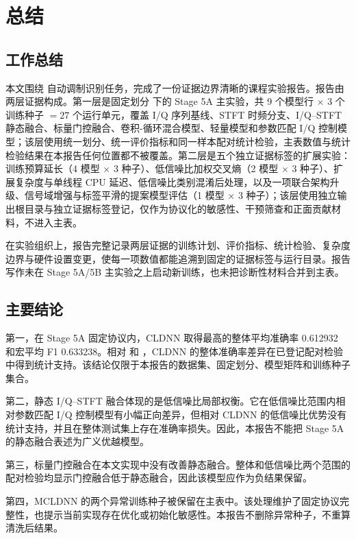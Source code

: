 \chapter{总结}

\section{工作总结}

本文围绕 \datasetname{} 自动调制识别任务，完成了一份证据边界清晰的课程实验报告。报告由两层证据构成。第一层是固定划分 \splitname{} 下的 Stage 5A 主实验，共 9 个模型行 \(\times\) 3 个训练种子 \(=27\) 个运行单元，覆盖 I/Q 序列基线、STFT 时频分支、I/Q--STFT 静态融合、标量门控融合、卷积-循环混合模型、轻量模型和参数匹配 I/Q 控制模型；该层使用统一划分、统一评价指标和同一样本配对统计检验，主表数值与统计检验结果在本报告任何位置都不被覆盖。第二层是五个独立证据标签的扩展实验：训练预算延长（4 模型 \(\times\) 3 种子）、低信噪比加权交叉熵（2 模型 \(\times\) 3 种子）、扩展复杂度与单线程 CPU 延迟、低信噪比类别混淆后处理，以及一项联合架构升级、信号域增强与标签平滑的提案模型评估（1 模型 \(\times\) 3 种子）；该层使用独立输出根目录与独立证据标签登记，仅作为协议化的敏感性、干预筛查和正面贡献材料，不进入主表。

在实验组织上，报告完整记录两层证据的训练计划、评价指标、统计检验、复杂度边界与硬件设置变更，使每一项数值都能追溯到固定的证据标签与运行目录。报告写作未在 Stage 5A/5B 主实验之上启动新训练，也未把诊断性材料合并到主表。

\section{主要结论}

第一，在 Stage 5A 固定协议内，CLDNN 取得最高的整体平均准确率 0.612932 和宏平均 F1 0.633238。相对  和 ，CLDNN 的整体准确率差异在已登记配对检验中得到统计支持。该结论仅限于本报告的数据集、固定划分、模型矩阵和训练种子集合。

第二，静态 I/Q--STFT 融合体现的是低信噪比局部权衡。它在低信噪比范围内相对参数匹配 I/Q 控制模型有小幅正向差异，但相对 CLDNN 的低信噪比优势没有统计支持，并且在整体测试集上存在准确率损失。因此，本报告不能把 Stage 5A 的静态融合表述为广义优越模型。

第三，标量门控融合在本文实现中没有改善静态融合。整体和低信噪比两个范围的配对检验均显示门控融合低于静态融合，因此该模型应作为负结果保留。

第四，MCLDNN 的两个异常训练种子被保留在主表中。该处理维护了固定协议完整性，也提示当前实现存在优化或初始化敏感性。本报告不删除异常种子，不重算清洗后结果。

